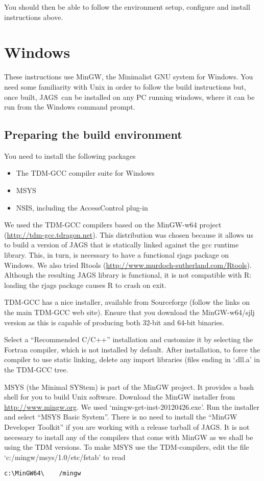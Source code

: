 \documentclass[11pt, a4paper, titlepage]{article}
\newcommand{\JAGS}{\textsf{JAGS}}
\newcommand{\file}[1]{{`\normalfont\textsf{#1}'}}
\begin{document}
You should then be able to follow the environment setup, configure and
install instructions above.

\clearpage
\section{Windows}
\label{section:windows}

These instructions use MinGW, the Minimalist GNU system for Windows.
You need some familiarity with Unix in order to follow the build
instructions but, once built, \JAGS\ can be installed on any PC
running windows, where it can be run from the Windows command prompt.

\subsection{Preparing the build environment}

You need to install the following packages
\begin{itemize}
\item The TDM-GCC compiler suite for Windows
\item MSYS  
\item NSIS, including the AccessControl plug-in  
\end{itemize}

We used the TDM-GCC compilers based on the MinGW-w64 project
(\url{http://tdm-gcc.tdragon.net}).  This distribution was chosen
because it allows us to build a version of JAGS that is statically
linked against the gcc runtime library.  This, in turn, is necessary
to have a functional rjags package on Windows.  We also tried 
Rtools (\url{http://www.murdoch-sutherland.com/Rtools}). Although the
resulting JAGS library is functional, it is not compatible with R:
loading the rjags package causes R to crash on exit.

TDM-GCC has a nice installer, available from Sourceforge (follow the
links on the main TDM-GCC web site). Ensure that you download the
MinGW-w64/sjlj version as this is capable of producing both 32-bit and
64-bit binaries.

Select a ``Recommended C/C++'' installation and customize it by
selecting the Fortran compiler, which is not installed by
default. After installation, to force the compiler to use static
linking, delete any import libraries (files ending in \file{.dll.a}
in the TDM-GCC tree.  

MSYS (the Minimal SYStem) is part of the MinGW project. It provides a
bash shell for you to build Unix software. Download the MinGW
installer from \url{http://www.mingw.org}. We used
\file{mingw-get-inst-20120426.exe}.  Run the installer and select
``MSYS Basic System''.  There is no need to install the ``MinGW
Developer Toolkit'' if you are working with a release tarball of
\JAGS.  It is not necessary to install any of the compilers that come
with MinGW as we shall be using the TDM versions. To make MSYS use the
TDM-compilers, edit the file \file{c:/mingw/msys/1.0/etc/fstab}
to read
\begin{verbatim}
c:\MinGW64\    /mingw
\end{verbatim}
\end{document}
